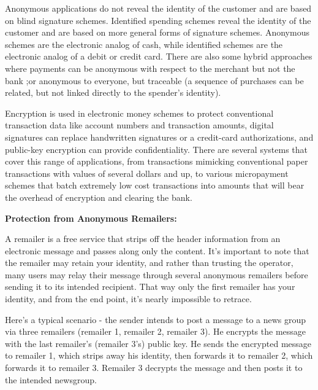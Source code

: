 \documentclass[a4paper,12pt]{article}
\begin{document}
        
        Anonymous applications do not reveal the identity of the customer and are based on blind signature schemes. Identified spending schemes reveal the identity of the customer and are based on more general forms of signature schemes. Anonymous schemes are the electronic analog of cash, while identified schemes are the electronic analog of a debit or credit card. There are also some hybrid approaches where payments can be anonymous with respect to the merchant but not the bank ;or anonymous to everyone, but traceable (a sequence of purchases can be related, but not linked directly to the spender's identity).

        \vspace*{0.2cm}

        Encryption is used in electronic money schemes to protect conventional transaction data like account numbers and transaction amounts, digital signatures can replace handwritten signatures or a credit-card authorizations, and public-key encryption can provide confidentiality. There are several systems that cover this range of applications, from transactions mimicking conventional paper transactions with values of several dollars and up, to various micropayment schemes that batch extremely low cost transactions into amounts that will bear the overhead of encryption and clearing the bank.
        \
        \vspace*{0.5cm}

        \large{{\bf Protection from Anonymous Remailers:}}
        \vspace*{0.4cm}

        A remailer is a free service that strips off the header information from an electronic message and passes along only the content. It's important to note that the remailer may retain your identity, and rather than trusting the operator, many users may relay their message through several anonymous remailers before sending it to its intended recipient. That way only the first remailer has your identity, and from the end point, it's nearly impossible to retrace.
        \vspace*{0.2cm}

        Here's a typical scenario - the sender intends to post a message to a news group via three remailers (remailer 1, remailer 2, remailer 3). He encrypts the message with the last remailer's (remailer 3's) public key. He sends the encrypted message to remailer 1, which strips away his identity, then forwards it to remailer 2, which forwards it to remailer 3. Remailer 3 decrypts the message and then posts it to the intended newsgroup.
\end{document}
